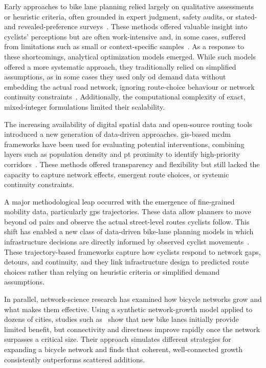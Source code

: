     Early approaches to bike lane planning relied largely on qualitative assessments or heuristic criteria, often grounded in expert judgment, safety audits, or stated- and revealed-preference surveys~\cite{Dondi2011, Tilahun2007, Sener2009}. These methods offered valuable insight into cyclists’ perceptions but are often work-intensive and, in some cases, suffered from limitations such as small or context-specific samples~\cite{Tilahun2007}. As a response to these shortcomings, analytical optimization models emerged. While such models offered a more systematic approach, they traditionally relied on simplified assumptions, as in some cases they used only \ac{od} demand data without embedding the actual road network, ignoring route-choice behaviour or network continuity constraints~\cite{Lin2011}. Additionally, the computational complexity of exact, mixed-integer formulations limited their scalability. 

    The increasing availability of digital spatial data and open-source routing tools introduced a new generation of data-driven approaches. \ac{gis}-based \ac{mcdm} frameworks have been used for evaluating potential interventions, combining layers such as population density and \ac{pt} proximity to identify high-priority corridors~\cite{Rybarczyk2010, Guler2021a}. These methods offered transparency and flexibility but still lacked the capacity to capture network effects, emergent route choices, or systemic continuity constraints.

    A major methodological leap occurred with the emergence of fine-grained mobility data, particularly \ac{gps} trajectories. These data allow planners to move beyond \ac{od} pairs and observe the actual street-level routes cyclists follow. This shift has enabled a new class of data-driven bike-lane planning models in which infrastructure decisions are directly informed by observed cyclist movements~\cite{Liu2022, Bao2017}. These trajectory-based frameworks capture how cyclists respond to network gaps, detours, and continuity, and they link infrastructure design to predicted route choices rather than relying on heuristic criteria or simplified demand assumptions.

    In parallel, network-science research has examined how bicycle networks grow and what makes them effective. Using a synthetic network-growth model applied to dozens of cities, studies such as~\cite{Szell2022} show that new bike lanes initially provide limited benefit, but connectivity and directness improve rapidly once the network surpasses a critical size. Their approach simulates different strategies for expanding a bicycle network and finds that coherent, well-connected growth consistently outperforms scattered additions.


